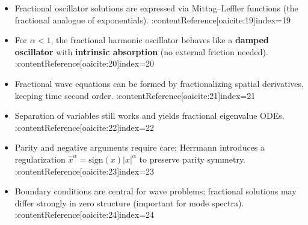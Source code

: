 \begin{itemize}
\item Fractional oscillator solutions are expressed via Mittag--Leffler functions
(the fractional analogue of exponentials). :contentReference[oaicite:19]{index=19}
\item For $\alpha<1$, the fractional harmonic oscillator behaves like a \textbf{damped oscillator}
with \textbf{intrinsic absorption} (no external friction needed). :contentReference[oaicite:20]{index=20}
\item Fractional wave equations can be formed by fractionalizing spatial derivatives,
keeping time second order. :contentReference[oaicite:21]{index=21}
\item Separation of variables still works and yields fractional eigenvalue ODEs. :contentReference[oaicite:22]{index=22}
\item Parity and negative arguments require care; Herrmann introduces a regularization
$\hat{x}^\alpha=\mathrm{sign}(x)|x|^\alpha$ to preserve parity symmetry. :contentReference[oaicite:23]{index=23}
\item Boundary conditions are central for wave problems; fractional solutions may differ
strongly in zero structure (important for mode spectra). :contentReference[oaicite:24]{index=24}
\end{itemize}
